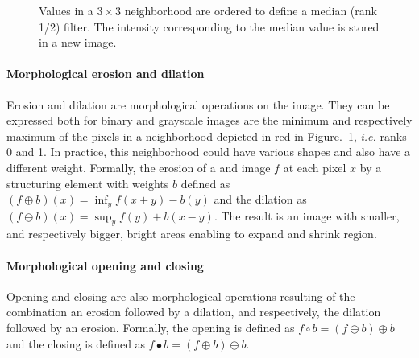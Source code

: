 \begin{figure}[ht]\centering
    \caption{Values in a $3 \times 3$ neighborhood are ordered to define a median (rank 1/2)
    filter. The intensity corresponding to the median value is stored in a new image.}
    \label{fig:median}
\end{figure}

\paragraph{Morphological erosion and dilation} Erosion and dilation are morphological operations on the image. They can be expressed both for binary and grayscale images are the minimum and respectively maximum of the pixels in a neighborhood depicted in red in Figure.~\ref{fig:median}, \textit{i.e.} ranks 0 and 1. In practice, this neighborhood could have various shapes and also have a different weight. Formally, the erosion of a and image $f$ at each pixel $x$ by a structuring element with weights $b$ defined as $(f \oplus b)(x) = \inf_{y} f(x+y) - b(y)$ and the dilation as $(f \ominus b)(x) = \sup_{y} f(y) + b(x-y)$. The result is an image with smaller, and respectively bigger, bright areas enabling to expand and shrink region.

\paragraph{Morphological opening and closing} Opening and closing are also morphological operations resulting of the combination an erosion followed by a dilation, and respectively, the dilation followed by an erosion. Formally, the opening is defined as $f \circ b  = (f \ominus b) \oplus b$ and the closing is defined as $f \bullet  b  = (f \oplus b) \ominus b$.

